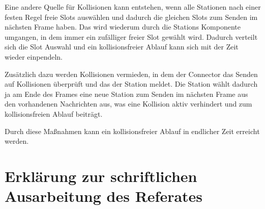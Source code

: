 \documentclass[draft=false
              ,paper=a4
              ,twoside=false
              ,fontsize=11pt
              ,headsepline
              ,BCOR10mm
              ,DIV11
              ]{scrbook}
\begin{document}
Eine andere Quelle für Kollisionen kann entstehen, wenn alle Stationen nach einer festen Regel freie Slots auswählen und dadurch die gleichen Slots zum Senden im nächsten Frame haben. Das wird wiederum durch die Stations Komponente umgangen, in dem immer ein zufälliger freier Slot gewählt wird. Dadurch verteilt sich die Slot Auswahl und ein kollisionsfreier Ablauf kann sich mit der Zeit wieder einpendeln.

Zusätzlich dazu werden Kollisionen vermieden, in dem der Connector das Senden auf Kollisionen überprüft und das der Station meldet. Die Station wählt dadurch ja am Ende des Frames eine neue Station zum Senden im nächsten Frame aus den vorhandenen Nachrichten aus, was eine Kollision aktiv verhindert und zum kollisionsfreien Ablauf beiträgt.

Durch diese Maßnahmen kann ein kollisionsfreier Ablauf in endlicher Zeit erreicht werden.


\backmatter




\renewcommand{\nomname}{Glossar}
\clearpage
\markboth{\nomname}{\nomname} %
\printnomenclature

\printindex
\chapter{Erklärung zur schriftlichen Ausarbeitung des Referates}
\HAWasurency
\end{document}
